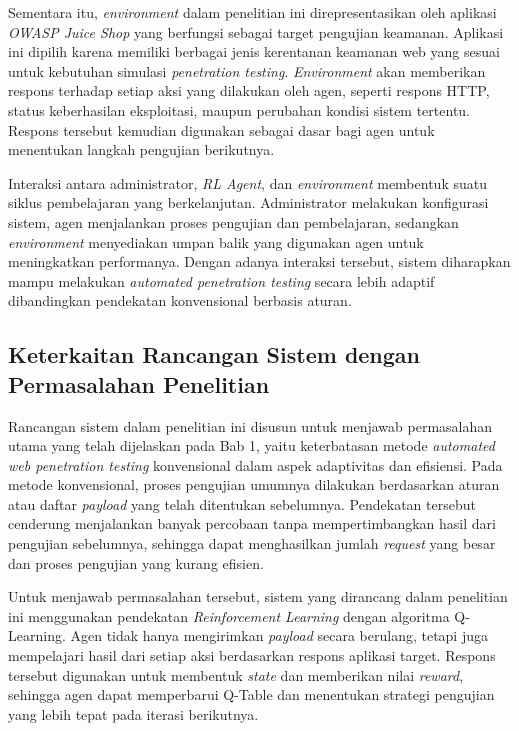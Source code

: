 Sementara itu, \textit{environment} dalam penelitian ini direpresentasikan oleh aplikasi \textit{OWASP Juice Shop} yang berfungsi sebagai target pengujian keamanan. Aplikasi ini dipilih karena memiliki berbagai jenis kerentanan keamanan web yang sesuai untuk kebutuhan simulasi \textit{penetration testing}. \textit{Environment} akan memberikan respons terhadap setiap aksi yang dilakukan oleh agen, seperti respons HTTP, status keberhasilan eksploitasi, maupun perubahan kondisi sistem tertentu. Respons tersebut kemudian digunakan sebagai dasar bagi agen untuk menentukan langkah pengujian berikutnya.

Interaksi antara administrator, \textit{RL Agent}, dan \textit{environment} membentuk suatu siklus pembelajaran yang berkelanjutan. Administrator melakukan konfigurasi sistem, agen menjalankan proses pengujian dan pembelajaran, sedangkan \textit{environment} menyediakan umpan balik yang digunakan agen untuk meningkatkan performanya. Dengan adanya interaksi tersebut, sistem diharapkan mampu melakukan \textit{automated penetration testing} secara lebih adaptif dibandingkan pendekatan konvensional berbasis aturan.

\usetikzlibrary{positioning, fit, arrows.meta, backgrounds}

\subsection{Keterkaitan Rancangan Sistem dengan Permasalahan Penelitian}

Rancangan sistem dalam penelitian ini disusun untuk menjawab permasalahan utama yang telah dijelaskan pada Bab 1, yaitu keterbatasan metode \textit{automated web penetration testing} konvensional dalam aspek adaptivitas dan efisiensi. Pada metode konvensional, proses pengujian umumnya dilakukan berdasarkan aturan atau daftar \textit{payload} yang telah ditentukan sebelumnya. Pendekatan tersebut cenderung menjalankan banyak percobaan tanpa mempertimbangkan hasil dari pengujian sebelumnya, sehingga dapat menghasilkan jumlah \textit{request} yang besar dan proses pengujian yang kurang efisien.

Untuk menjawab permasalahan tersebut, sistem yang dirancang dalam penelitian ini menggunakan pendekatan \textit{Reinforcement Learning} dengan algoritma Q-Learning. Agen tidak hanya mengirimkan \textit{payload} secara berulang, tetapi juga mempelajari hasil dari setiap aksi berdasarkan respons aplikasi target. Respons tersebut digunakan untuk membentuk \textit{state} dan memberikan nilai \textit{reward}, sehingga agen dapat memperbarui Q-Table dan menentukan strategi pengujian yang lebih tepat pada iterasi berikutnya.

